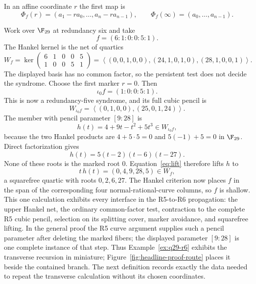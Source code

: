 In an affine coordinate $r$ the first map is
\[
\Phi_f(r)=(a_1-ra_0,\ldots,a_n-ra_{n-1}),\qquad
\Phi_f(\infty)=(a_0,\ldots,a_{n-1}).
\]

\begin{example}[The complete R5-to-R6 propagation at $q=29$]
\label{ex:q29-r6}
Work over $\F_{29}$ at redundancy six and take
\[
 f=(6:1:0:0:5:1).
\]
The Hankel kernel is the net of quartics
\[
 W_f=\ker
 \begin{pmatrix}6&1&0&0&5\\1&0&0&5&1\end{pmatrix}
 =
 \left\langle
 (0,0,1,0,0),(24,1,0,1,0),(28,1,0,0,1)
 \right\rangle .
\]
The displayed basis has no common factor, so the persistent test does
not decide the syndrome.  Choose the first marker $r=0$.  Then
\[
 \iota_0f=(1:0:0:5:1).
\]
This is now a redundancy-five syndrome, and its full cubic pencil is
\[
 W_{\iota_0f}
 =\left\langle(0,1,0,0),(25,0,1,24)\right\rangle .
\]
The member with pencil parameter \([9:28]\) is
\[
 h(t)=4+9t-t^2+5t^3\in W_{\iota_0f},
\]
because the two Hankel products are $4+5\cdot5=0$ and
$5(-1)+5=0$ in $\F_{29}$.  Direct factorization gives
\[
 h(t)=5(t-2)(t-6)(t-27).
\]
None of these roots is the marked root $0$.  Equation~\eqref{eq:lift}
therefore lifts $h$ to
\[
 t\,h(t)=(0,4,9,28,5)\in W_f,
\]
a squarefree quartic with roots $0,2,6,27$.  The Hankel criterion now
places $f$ in the span of the corresponding four normal-rational-curve
columns, so $f$ is shallow.  This one calculation exhibits every
interface in the R5-to-R6 propagation: the upper Hankel net, the
ordinary common-factor test, contraction to the complete R5 cubic
pencil, selection on its splitting cover, marker avoidance, and
squarefree lifting.  In the general proof the R5 curve argument
supplies such a pencil parameter after deleting the marked fibers; the
displayed parameter \([9:28]\) is one complete instance of that step.
Thus Example~\ref{ex:q29-r6} exhibits the transverse recursion in miniature;
Figure~\ref{fig:headline-proof-route} places it beside the contained branch.  The next
definition records exactly the data needed to repeat the transverse
calculation without its chosen coordinates.
\end{example}

